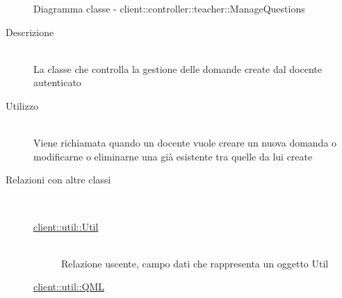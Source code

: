 \vspace{0.5cm}
\hypertarget{client::controller::teacher::ManageQuestions}{}
\begin{figure}[H]
	\centering
	\caption{Diagramma classe - client::controller::teacher::ManageQuestions}
\end{figure}\begin{description}
\item[Descrizione] \hfill \\
La classe che controlla la gestione delle domande create dal docente autenticato
\item[Utilizzo] \hfill \\
Viene richiamata quando un docente vuole creare un nuova domanda o modificarne o eliminarne una già esistente tra quelle da lui create
\item[Relazioni con altre classi] \hfill \\
\vspace{-7mm}
\begin{description}
	\item[\hyperlink{client::util::Util}{client::util::Util}] \hfill \\
	Relazione uscente, campo dati che rappresenta un oggetto Util
	\item[\hyperlink{client::util::QML}{client::util::QML}] \hfill \\

\end{description}
\end{description}
